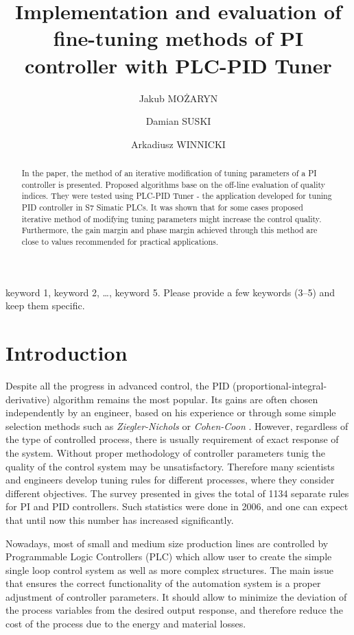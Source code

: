 \documentclass{amcs}
\title[Implemention and evaluation...]{Implementation and evaluation of fine-tuning methods of PI controller with PLC-PID Tuner}
\author[ad1][]{Jakub MO\.{Z}ARYN}
\author[ad1][]{Damian SUSKI}
\author[ad1][]{Arkadiusz WINNICKI}
\begin{document}
\begin{abstract}
In the paper, the method of an iterative modification of tuning parameters of a PI controller is presented. Proposed algorithms base on the off-line evaluation of quality indices. They were tested using PLC-PID Tuner - the application developed for tuning PID controller in S7 Simatic PLCs. It was shown that for some cases  proposed iterative method of modifying tuning parameters might increase the control quality. Furthermore, the gain margin and phase margin achieved  through this method are close to values recommended for  practical applications.
\end{abstract}

\begin{keywords}
keyword 1, keyword 2, \dots, keyword 5. Please provide a few keywords (3--5) and keep them specific.
\end{keywords}
\maketitle

\section{Introduction}
Despite all the progress in advanced control, the PID (proportional-integral-derivative) algorithm remains the most popular. Its gains are often chosen independently by an engineer, based on his experience or through some simple selection methods such as \textit{Ziegler-Nichols} \cite{Ziegler:1942} or \textit{Cohen-Coon} \cite{Cohen:1953}. However, regardless of the type of controlled process, there is usually requirement of exact response of the system. Without proper methodology of controller parameters tunig the quality of the control system may be unsatisfactory. Therefore many scientists and engineers develop tuning rules for different processes, where they consider different objectives. The survey presented in \cite{Odwyer:2006} gives the total of 1134 separate rules for PI and PID controllers. Such statistics were done in 2006, and one can expect that until now this number has increased significantly.

Nowadays, most of small and medium size production lines are controlled by Programmable Logic Controllers (PLC) which allow user to create the simple single loop control system as well as more complex structures. The main issue that ensures the correct functionality of the automation system is a proper adjustment of controller parameters. It should allow to minimize the deviation of the process variables from the desired output response, and therefore reduce the cost of the process due to the energy and material losses. 
\end{document}
